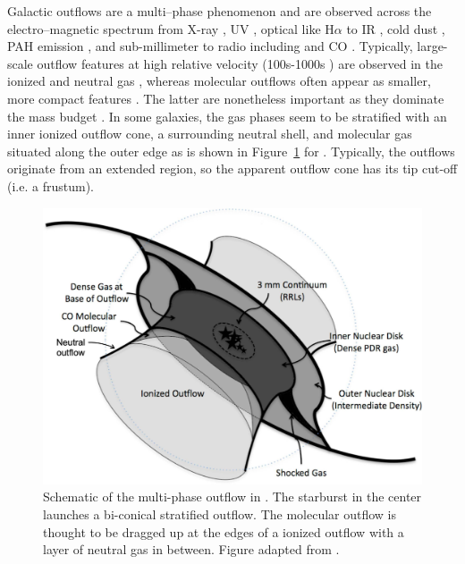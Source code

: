 Galactic outflows are a multi--phase phenomenon and are observed across the electro--magnetic spectrum from X-ray \citep[e.g.][]{2007ApJ...658..258S}, UV \citep[e.g.][]{2005ApJ...619L..99H}, optical like H$\alpha$ \citep[e.g.][]{2009ApJ...696..192W} to IR \citep[e.g.][]{2009ApJ...700L.149V}, cold dust \citep[e.g.][]{2010A&A...518L..66R}, PAH emission \citep[e.g.][]{2006ApJ...642L.127E}, and sub-millimeter to radio including \hi and CO \citep[e.g.][]{2013Natur.499..450B,2015ApJ...814...83L,Lucero:2015if}. Typically, large-scale outflow features at high relative velocity (100s-1000s \kms) are observed in the ionized and neutral gas \citep[e.g.][]{1990ApJS...74..833H,2019MNRAS.486..344R}, whereas molecular outflows often appear as smaller, more compact features \citep[e.g.][]{Strickland:2002kp,Westmoquette:2011bp}. The latter are nonetheless important as they dominate the mass budget \citep{2015ApJ...814...83L}. In some galaxies, the gas phases seem to be stratified with an inner ionized outflow cone, a surrounding neutral shell, and molecular gas situated along the outer edge as is shown in Figure~\ref{introduction: figure: star formation: outflow cone} for  \citep[e.g.][]{2015ApJ...801...63M}. Typically, the outflows originate from an extended region, so the apparent outflow cone has its tip cut-off (i.e. a frustum). 

\begin{figure}
	\centering
	\includegraphics[width=0.7\linewidth]{images/chapters/introduction/sf/outflow_cone.pdf}
	\caption[Schematic of a multi-phase outflow in ]{Schematic of the multi-phase outflow in . The starburst in the center launches a bi-conical stratified outflow. The molecular outflow is thought to be dragged up at the edges of a ionized outflow with a layer of neutral gas in between.
	Figure adapted from \citet{2015ApJ...801...63M}.}
	\label{introduction: figure: star formation: outflow cone}
\end{figure}

